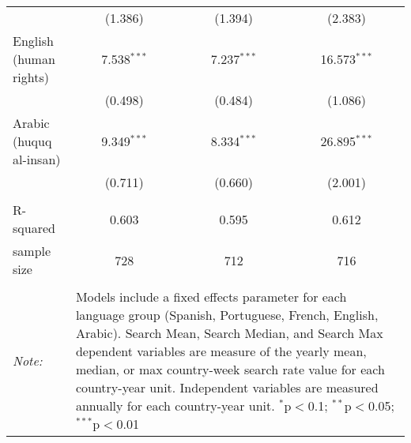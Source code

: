 \begin{table}[!htbp]
\begin{tabular}{@{\extracolsep{5pt}}lccc}
  & (1.386) & (1.394) & (2.383) \\ 
  English (human rights) & 7.538$^{***}$ & 7.237$^{***}$ & 16.573$^{***}$ \\ 
  & (0.498) & (0.484) & (1.086) \\ 
  Arabic (huquq al-insan) & 9.349$^{***}$ & 8.334$^{***}$ & 26.895$^{***}$ \\ 
  & (0.711) & (0.660) & (2.001) \\ 
 \hline \\[-1.8ex] 
R-squared  & 0.603 & 0.595 & 0.612 \\ 
sample size  & 728 & 712 & 716 \\ 
\hline 
\hline \\[-1.8ex] 
\textit{Note:}  & \multicolumn{3}{l}{\parbox[t]{8cm}{Models include a fixed effects parameter for each language group (Spanish, Portuguese, French, English, Arabic). Search Mean, Search Median, and Search Max dependent variables are measure of the yearly mean, median, or max country-week search rate value for each country-year unit. Independent variables are measured annually for each country-year unit. $^{*}$p$<$0.1; $^{**}$p$<$0.05; $^{***}$p$<$0.01}} \\ 
\end{tabular} 
\end{table} 
